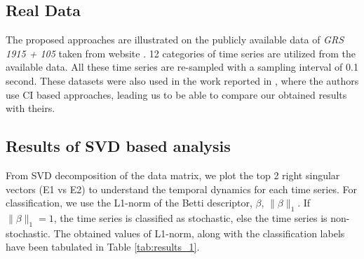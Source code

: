 \documentclass[journal]{IEEEtran}
\begin{document}
	\subsection{Real Data}
	The proposed approaches are illustrated on the publicly available data of \textit{GRS 1915 + 105} taken from website \cite{xte}. 12 categories of time series are utilized from the available data. All these time series are re-sampled with a sampling interval of 0.1 second. These datasets  were  also used in the work reported in \cite{Adegoke2018}, where the authors use CI based approaches, leading us to be able to compare our obtained results with theirs.

	\subsection{Results of SVD based analysis}
	
	
	From SVD decomposition of the data matrix, we plot the top 2 right singular vectors (E1 vs E2) to understand the temporal dynamics for each time series. For classification, we use the L1-norm of the Betti descriptor, $\beta$, $\|\beta\|_1$. If $\|\beta\|_1 = 1$, the time series is classified as stochastic, else the time series is non-stochastic. The obtained values of L1-norm, along with the classification labels have been tabulated in Table \ref{tab:results_1}.
%	
	
\end{document}
